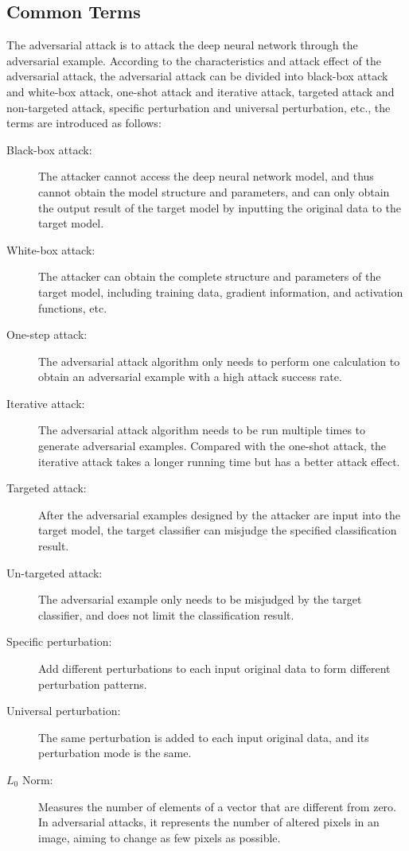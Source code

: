 \documentclass[10pt, conference, a4paper, final]{IEEEtran}
\begin{document}
\subsection{Common Terms}

The adversarial attack is to attack the deep neural network through the adversarial example. According to the characteristics and attack effect of the adversarial attack, the adversarial attack can be divided into black-box attack and white-box attack, one-shot attack and iterative attack, targeted attack and non-targeted attack, specific perturbation and universal perturbation, etc., the terms are introduced as follows:

\begin{description}
    \item[Black-box attack:] The attacker cannot access the deep neural network model, and thus cannot obtain the model structure and parameters, and can only obtain the output result of the target model by inputting the original data to the target model.
    \item[White-box attack:] The attacker can obtain the complete structure and parameters of the target model, including training data, gradient information, and activation functions, etc.
    \item[One-step attack:] The adversarial attack algorithm only needs to perform one calculation to obtain an adversarial example with a high attack success rate.
    \item[Iterative attack:] The adversarial attack algorithm needs to be run multiple times to generate adversarial examples. Compared with the one-shot attack, the iterative attack takes a longer running time but has a better attack effect.
    \item[Targeted attack:] After the adversarial examples designed by the attacker are input into the target model, the target classifier can misjudge the specified classification result.
    \item[Un-targeted attack:] The adversarial example only needs to be misjudged by the target classifier, and does not limit the classification result.
    \item[Specific perturbation:] Add different perturbations to each input original data to form different perturbation patterns.
    \item[Universal perturbation:] The same perturbation is added to each input original data, and its perturbation mode is the same.
  \item [$L_0$ Norm:] Measures the number of elements of a vector that are different from zero. In adversarial attacks, it represents the number of altered pixels in an image, aiming to change as few pixels as possible.

\end{description}
\end{document}
